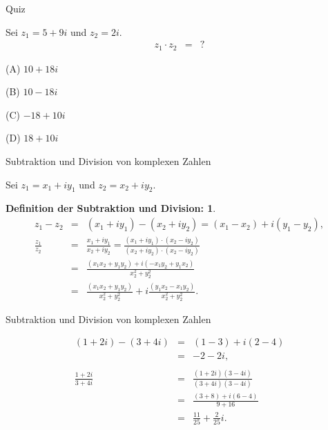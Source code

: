 \documentclass[german]{beamer}
\newcommand{\bq}{\begin{eqnarray*}}
\newcommand{\eq}{\end{eqnarray*}}
\newtheorem*{mytheorem7a}{Definition der Subtraktion und Division:}
\begin{document}
\begin{frame}{Quiz}

Sei $z_1=5+9i$ und $z_2=2i$.
\bq
 z_1 \cdot z_2 & = & ?
\eq 
\begin{description}
\item{(A)} $10+18i$
\item{(B)} $10-18i$
\item{(C)} $-18+10i$
\item{(D)} $18+10i$
\end{description}

\end{frame}

\begin{frame}{Subtraktion und Division von komplexen Zahlen}

Sei $z_1=x_1+iy_1$ und $z_2=x_2+iy_2$.
\begin{mytheorem7a}
\bq
 z_1 - z_2 & = & \left( x_1+iy_1 \right) - \left( x_2+iy_2 \right) = \left(x_1-x_2\right) + i \left(y_1-y_2\right),
 \nonumber \\
\frac{z_1}{z_2} & = & \frac{x_1+iy_1}{x_2+iy_2} 
 = \frac{\left( x_1+iy_1 \right) \cdot \left( x_2-iy_2 \right)}{\left( x_2+iy_2 \right) \cdot \left( x_2-iy_2 \right)} 
 \nonumber \\
 & = & 
 \frac{\left(x_1 x_2 + y_1 y_2 \right) + i \left(-x_1 y_2 + y_1 x_2 \right)}{x_2^2+y_2^2}
 \nonumber \\
 & = & 
 \frac{\left(x_1 x_2 + y_1 y_2 \right)}{x_2^2+y_2^2}
 + 
 i \frac{\left(y_1 x_2 - x_1 y_2\right)}{x_2^2+y_2^2}.
\eq
\end{mytheorem7a}

\end{frame}

\begin{frame}{Subtraktion und Division von komplexen Zahlen}

\begin{example}
\bq
 \left(1+2i\right) - \left(3+4i\right) & = & \left(1-3\right) + i \left(2-4\right)
 \nonumber \\
 & = & 
 -2 - 2i,
 \nonumber \\
 & & \nonumber \\
 \frac{1+2i}{3+4i} 
 & = & 
 \frac{\left(1+2i\right)\left(3-4i\right)}{\left(3+4i\right)\left(3-4i\right)}
 \nonumber \\
 & = &
 \frac{\left(3+8\right) + i\left(6-4\right)}{9+16}
 \nonumber \\
 & = &
 \frac{11}{25} + \frac{2}{25} i.
\eq
\end{example}

\end{frame}
\end{document}
